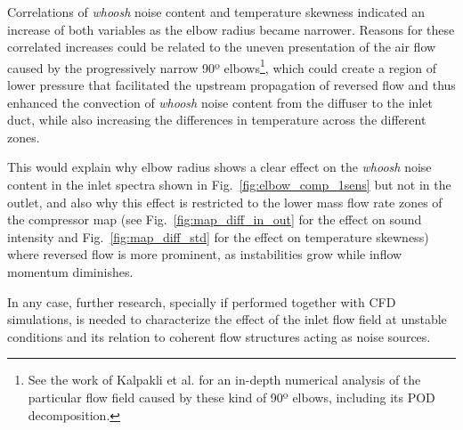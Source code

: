 Correlations of \emph{whoosh} noise content and temperature skewness indicated an increase of both variables as the elbow radius became narrower. Reasons for these correlated increases could be related to the uneven presentation of the air flow caused by the progressively narrow 90º elbows\footnote{See the work of Kalpakli et al. \cite{kalpakli2013vortical,kalpakli2013turbulent} for an in-depth numerical analysis of the particular flow field caused by these kind of 90º elbows, including its POD decomposition.}, which could create a region of lower pressure that facilitated the upstream propagation of reversed flow and thus enhanced the convection of \emph{whoosh} noise content from the diffuser to the inlet duct, while also increasing the differences in temperature across the different zones.

This would explain why elbow radius shows a clear effect on the \emph{whoosh} noise content in the inlet spectra shown in Fig.~\ref{fig:elbow_comp_1sens} but not in the outlet, and also why this effect is restricted to the lower mass flow rate zones of the compressor map (see Fig.~\ref{fig:map_diff_in_out} for the effect on sound intensity and Fig.~\ref{fig:map_diff_std} for the effect on temperature skewness) where reversed flow is more prominent, as instabilities grow while inflow momentum diminishes. 

In any case, further research, specially if performed together with CFD simulations, is needed to characterize the effect of the inlet flow field at unstable conditions and its relation to coherent flow structures acting as noise sources.
